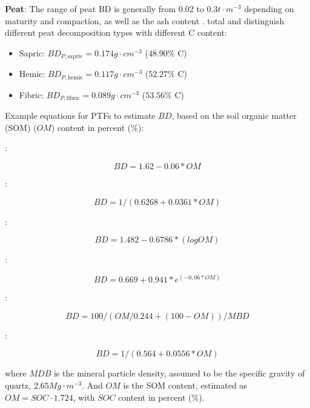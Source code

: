 \documentclass[10pt,b5paper,]{book}
\theoremstyle{definition}
\theoremstyle{definition}
\theoremstyle{definition}
\theoremstyle{remark}
\begin{document}
\textbf{Peat}: The range of peat BD is generally from 0.02 to
0.3\(t \cdot m^{-3}\) depending on maturity and compaction, as well as
the ash content \citep{agus_measuring_2011}. total and
\citet{agus_measuring_2011} distinguish different peat decomposition
types with different C content:

\begin{itemize}
\item
  Sapric: \(BD_{P,\text{sapric}} = 0.174 g \cdot cm^{-3}\) (\(48.90\%\)
  C)
\item
  Hemic: \(BD_{P,\text{hemic}} = 0.117 g \cdot cm^{-3}\) (\(52.27\%\) C)
\item
  Fibric: \(BD_{P,\text{fibric}} = 0.089 g \cdot cm^{-3}\) (\(53.56\%\)
  C)
\end{itemize}

Example equations for PTFs to estimate \(BD\), based on the soil organic
matter (SOM) (\(OM\)) content in percent (\%):

\cite{saini_1966_organic}:

\begin{equation}
BD = 1.62-0.06 * OM
\end{equation}

\cite{Drew1973}:

\begin{equation}
BD = 1/(0.6268 + 0.0361 * OM)
\end{equation}

\cite{jeffrey1970note}:

\begin{equation}
BD = 1.482 - 0.6786 * (log OM)
\end{equation}

\cite{Grigal1989}:

\begin{equation}
BD = 0.669 + 0.941 * e^{(-0,06 * OM)}
\end{equation}

\cite{adams1973effect}:

\begin{equation}
BD = 100/(OM/0.244 + (100-OM))/MBD
\end{equation}

\cite{honeysett1989use}:

\begin{equation}
BD = 1/(0.564 + 0.0556*OM)
\end{equation}

where \(MDB\) is the mineral particle density, assumed to be the
specific gravity of quartz, \(2.65 Mg \cdot m^{-3}\). And \(OM\) is the
SOM content, estimated as \(OM = SOC \cdot 1.724\), with \(SOC\) content
in percent (\%).
\end{document}
